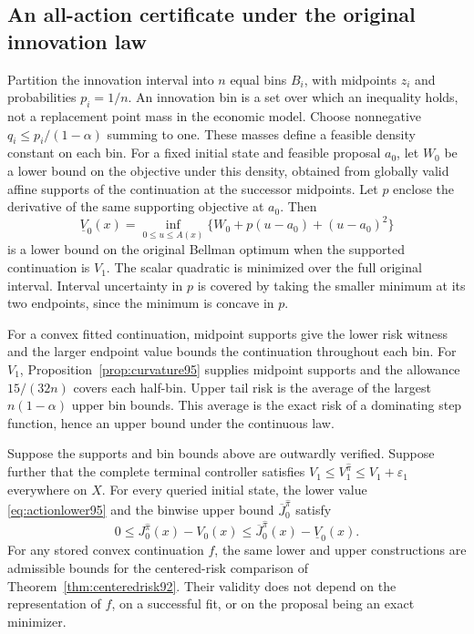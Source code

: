 \subsection{An all-action certificate under the original innovation law}
Partition the innovation interval into $n$ equal bins $B_i$, with midpoints $z_i$ and probabilities $p_i=1/n$. An innovation bin is a set over which an inequality holds, not a replacement point mass in the economic model. Choose nonnegative $q_i\leq p_i/(1-\alpha)$ summing to one. These masses define a feasible density constant on each bin. For a fixed initial state and feasible proposal $a_0$, let $W_0$ be a lower bound on the objective under this density, obtained from globally valid affine supports of the continuation at the successor midpoints. Let $p$ enclose the derivative of the same supporting objective at $a_0$. Then
\begin{equation}\label{eq:actionlower95}
 \underline V_0(x)=\inf_{0\leq u\leq A(x)}
         \{W_0+p(u-a_0)+(u-a_0)^2\}
\end{equation}
is a lower bound on the original Bellman optimum when the supported continuation is $V_1$. The scalar quadratic is minimized over the full original interval. Interval uncertainty in $p$ is covered by taking the smaller minimum at its two endpoints, since the minimum is concave in $p$.

For a convex fitted continuation, midpoint supports give the lower risk witness and the larger endpoint value bounds the continuation throughout each bin. For $V_1$, Proposition~\ref{prop:curvature95} supplies midpoint supports and the allowance $15/(32n)$ covers each half-bin. Upper tail risk is the average of the largest $n(1-\alpha)$ upper bin bounds. This average is the exact risk of a dominating step function, hence an upper bound under the continuous law.

\begin{theorem}\label{thm:continuous95}
Suppose the supports and bin bounds above are outwardly verified. Suppose further that the complete terminal controller satisfies
$V_1\leq V_1^{\widehat\pi}\leq V_1+\varepsilon_1$ everywhere on $X$.
For every queried initial state, the lower value \eqref{eq:actionlower95} and the binwise upper bound $\overline J_0^{\widehat\pi}$ satisfy
\begin{equation}\label{eq:originalgap95}
 0\leq J_0^{\widehat\pi}(x)-V_0(x)
       \leq\overline J_0^{\widehat\pi}(x)-\underline V_0(x).
\end{equation}
For any stored convex continuation $f$, the same lower and upper constructions are admissible bounds for the centered-risk comparison of Theorem~\ref{thm:centeredrisk92}. Their validity does not depend on the representation of $f$, on a successful fit, or on the proposal being an exact minimizer.
\end{theorem}

